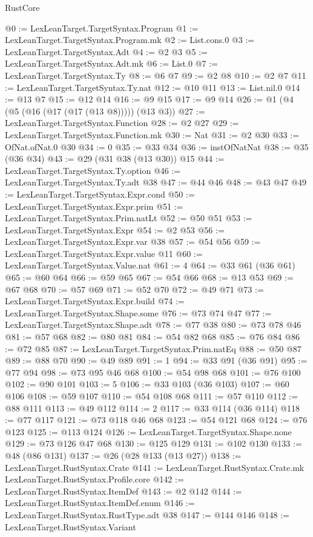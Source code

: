 \begin{lexlean}{RustCore}
\begin{coremodule}
@0 := LexLeanTarget.TargetSyntax.Program
@1 := LexLeanTarget.TargetSyntax.Program.mk
@2 := List.cons.{0}
@3 := LexLeanTarget.TargetSyntax.Adt
@4 := @2 @3
@5 := LexLeanTarget.TargetSyntax.Adt.mk
@6 := List.{0}
@7 := LexLeanTarget.TargetSyntax.Ty
@8 := @6 @7
@9 := @2 @8
@10 := @2 @7
@11 := LexLeanTarget.TargetSyntax.Ty.nat
@12 := @10 @11
@13 := List.nil.{0}
@14 := @13 @7
@15 := @12 @14
@16 := @9 @15
@17 := @9 @14
@26 := @1 (@4 (@5 (@16 (@17 (@17 (@13 @8))))) (@13 @3))
@27 := LexLeanTarget.TargetSyntax.Function
@28 := @2 @27
@29 := LexLeanTarget.TargetSyntax.Function.mk
@30 := Nat
@31 := @2 @30
@33 := OfNat.ofNat.{0} @30
@34 := 0
@35 := @33 @34
@36 := instOfNatNat
@38 := @35 (@36 @34)
@43 := @29 (@31 @38 (@13 @30)) @15
@44 := LexLeanTarget.TargetSyntax.Ty.option
@46 := LexLeanTarget.TargetSyntax.Ty.adt @38
@47 := @44 @46
@48 := @43 @47
@49 := LexLeanTarget.TargetSyntax.Expr.cond
@50 := LexLeanTarget.TargetSyntax.Expr.prim
@51 := LexLeanTarget.TargetSyntax.Prim.natLt
@52 := @50 @51
@53 := LexLeanTarget.TargetSyntax.Expr
@54 := @2 @53
@56 := LexLeanTarget.TargetSyntax.Expr.var @38
@57 := @54 @56
@59 := LexLeanTarget.TargetSyntax.Expr.value @11
@60 := LexLeanTarget.TargetSyntax.Value.nat
@61 := 4
@64 := @33 @61 (@36 @61)
@65 := @60 @64
@66 := @59 @65
@67 := @54 @66
@68 := @13 @53
@69 := @67 @68
@70 := @57 @69
@71 := @52 @70
@72 := @49 @71
@73 := LexLeanTarget.TargetSyntax.Expr.build
@74 := LexLeanTarget.TargetSyntax.Shape.some
@76 := @73 @74 @47
@77 := LexLeanTarget.TargetSyntax.Shape.adt
@78 := @77 @38
@80 := @73 @78 @46
@81 := @57 @68
@82 := @80 @81
@84 := @54 @82 @68
@85 := @76 @84
@86 := @72 @85
@87 := LexLeanTarget.TargetSyntax.Prim.natEq
@88 := @50 @87
@89 := @88 @70
@90 := @49 @89
@91 := 1
@94 := @33 @91 (@36 @91)
@95 := @77 @94
@98 := @73 @95 @46 @68
@100 := @54 @98 @68
@101 := @76 @100
@102 := @90 @101
@103 := 5
@106 := @33 @103 (@36 @103)
@107 := @60 @106
@108 := @59 @107
@110 := @54 @108 @68
@111 := @57 @110
@112 := @88 @111
@113 := @49 @112
@114 := 2
@117 := @33 @114 (@36 @114)
@118 := @77 @117
@121 := @73 @118 @46 @68
@123 := @54 @121 @68
@124 := @76 @123
@125 := @113 @124
@126 := LexLeanTarget.TargetSyntax.Shape.none
@129 := @73 @126 @47 @68
@130 := @125 @129
@131 := @102 @130
@133 := @48 (@86 @131)
@137 := @26 (@28 @133 (@13 @27))
@138 := LexLeanTarget.RustSyntax.Crate
@141 := LexLeanTarget.RustSyntax.Crate.mk LexLeanTarget.RustSyntax.Profile.core
@142 := LexLeanTarget.RustSyntax.ItemDef
@143 := @2 @142
@144 := LexLeanTarget.RustSyntax.ItemDef.enum
@146 := LexLeanTarget.RustSyntax.RustType.adt @38
@147 := @144 @146
@148 := LexLeanTarget.RustSyntax.Variant

\end{coremodule}
\end{lexlean}
